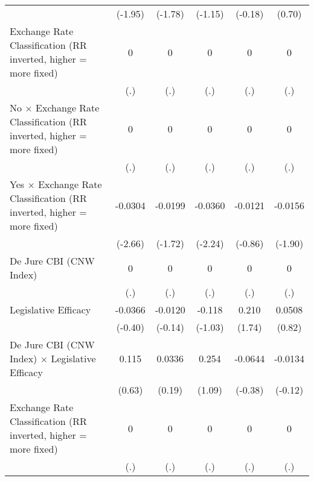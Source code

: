 {\begin{tabular}{l*{5}{c}}
                &  (-1.95)         &  (-1.78)         &  (-1.15)         &  (-0.18)         &   (0.70)         \\
[1em]
Exchange Rate Classification (RR inverted, higher = more fixed)&        0         &        0         &        0         &        0         &        0         \\
                &      (.)         &      (.)         &      (.)         &      (.)         &      (.)         \\
[1em]
No $\times$ Exchange Rate Classification (RR inverted, higher = more fixed)&        0         &        0         &        0         &        0         &        0         \\
                &      (.)         &      (.)         &      (.)         &      (.)         &      (.)         \\
[1em]
Yes $\times$ Exchange Rate Classification (RR inverted, higher = more fixed)&  -0.0304\sym{**} &  -0.0199         &  -0.0360\sym{*}  &  -0.0121         &  -0.0156         \\
                &  (-2.66)         &  (-1.72)         &  (-2.24)         &  (-0.86)         &  (-1.90)         \\
[1em]
De Jure CBI (CNW Index)&        0         &        0         &        0         &        0         &        0         \\
                &      (.)         &      (.)         &      (.)         &      (.)         &      (.)         \\
[1em]
Legislative Efficacy&  -0.0366         &  -0.0120         &   -0.118         &    0.210         &   0.0508         \\
                &  (-0.40)         &  (-0.14)         &  (-1.03)         &   (1.74)         &   (0.82)         \\
[1em]
De Jure CBI (CNW Index) $\times$ Legislative Efficacy&    0.115         &   0.0336         &    0.254         &  -0.0644         &  -0.0134         \\
                &   (0.63)         &   (0.19)         &   (1.09)         &  (-0.38)         &  (-0.12)         \\
[1em]
Exchange Rate Classification (RR inverted, higher = more fixed)&        0         &        0         &        0         &        0         &        0         \\
                &      (.)         &      (.)         &      (.)         &      (.)         &      (.)         \\

\end{tabular}}
